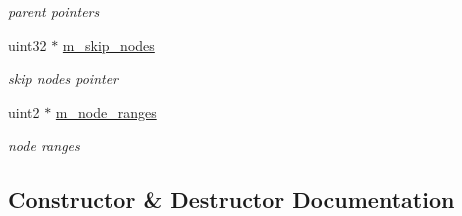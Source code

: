 \begin{DoxyCompactItemize}
\begin{DoxyCompactList}\small\item\em parent pointers \end{DoxyCompactList}\item 
\mbox{\label{structcugar_1_1_bintree__writer__context_3_01node__type_00_01leaf__index__tag_01_4_a8a8a2b9a253cd2629fd9f5ce950fa38d}} 
uint32 $\ast$ \hyperlink{structcugar_1_1_bintree__writer__context_3_01node__type_00_01leaf__index__tag_01_4_a8a8a2b9a253cd2629fd9f5ce950fa38d}{m\+\_\+skip\+\_\+nodes}
\begin{DoxyCompactList}\small\item\em skip nodes pointer \end{DoxyCompactList}\item 
\mbox{\label{structcugar_1_1_bintree__writer__context_3_01node__type_00_01leaf__index__tag_01_4_a96e479c2a88260fe36f9f06f18b797d1}} 
uint2 $\ast$ \hyperlink{structcugar_1_1_bintree__writer__context_3_01node__type_00_01leaf__index__tag_01_4_a96e479c2a88260fe36f9f06f18b797d1}{m\+\_\+node\+\_\+ranges}
\begin{DoxyCompactList}\small\item\em node ranges \end{DoxyCompactList}\end{DoxyCompactItemize}


\subsection{Constructor \& Destructor Documentation}
\mbox{\label{structcugar_1_1_bintree__writer__context_3_01node__type_00_01leaf__index__tag_01_4_aa3247197082ff28d6569e11d23a20e10}} 
